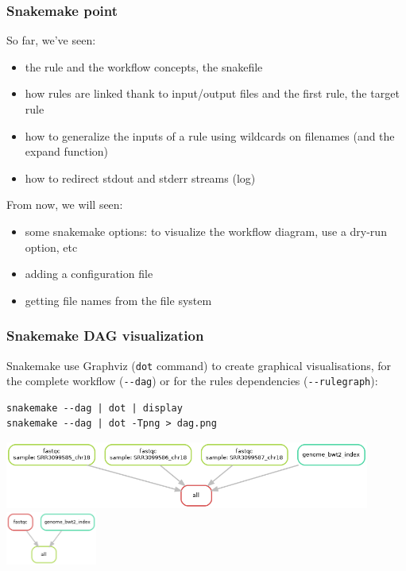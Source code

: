 \begin{frame}[containsverbatim]
\frametitle{Snakemake point}
\begin{block}{So far, we've seen:}
\begin{itemize}
    \item the rule and the workflow concepts, the snakefile
    \item how rules are linked thank to input/output files and the first rule, the target rule
    \item how to generalize the inputs of a rule using wildcards on filenames (and the expand function)
    \item how to redirect stdout and stderr streams (log)
\end{itemize}
\end{block}
\begin{block}{From now, we will seen:}
\begin{itemize}
    \item some snakemake options: to visualize the workflow diagram, use a dry-run option, etc
    \item adding a configuration file
    \item getting file names from the file system
\end{itemize}
\end{block}
\end{frame}
\begin{frame}[containsverbatim]
\frametitle{Snakemake DAG visualization}
\begin{block}{}
Snakemake use Graphviz (\verb|dot| command) to create graphical visualisations, for the complete workflow (\verb|--dag|) or for the rules dependencies (\verb|--rulegraph|):
\begin{lstlisting}
snakemake --dag | dot | display
snakemake --dag | dot -Tpng > dag.png
\end{lstlisting}
\end{block}
\begin{center}
    \includegraphics[width=12cm]{03_workflow/images/FAIR_ex1_o7_dag.png}\\
    \includegraphics[width=3cm]{03_workflow/images/FAIR_ex1_o5_ruleG.png}
\end{center}
\end{frame}
